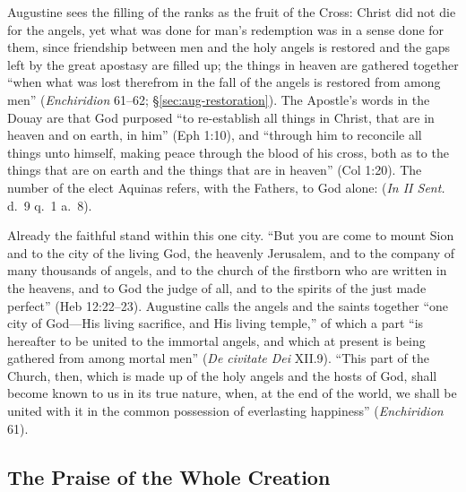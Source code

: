 Augustine sees the filling of the ranks as the fruit of the Cross: Christ
did not die for the angels, yet what was done for man's redemption was in a
sense done for them, since friendship between men and the holy angels is
restored and the gaps left by the great apostasy are filled up; the things
in heaven are gathered together ``when what was lost therefrom in the fall
of the angels is restored from among men'' (\emph{Enchiridion} 61--62;
\S\ref{sec:aug-restoration}). The Apostle's words in the Douay are that God
purposed ``to re-establish all things in Christ, that are in heaven and on
earth, in him'' (Eph 1:10), and ``through him to reconcile all things unto
himself, making peace through the blood of his cross, both as to the things
that are on earth and the things that are in heaven'' (Col 1:20). The number
of the elect Aquinas refers, with the Fathers, to God alone: 
(\emph{In II Sent.} d.~9 q.~1 a.~8).

Already the faithful stand within this one city. ``But you are come to mount
Sion and to the city of the living God, the heavenly Jerusalem, and to the
company of many thousands of angels, and to the church of the firstborn who
are written in the heavens, and to God the judge of all, and to the spirits
of the just made perfect'' (Heb 12:22--23). Augustine calls the angels and
the saints together ``one city of God---His living sacrifice, and His living
temple,'' of which a part ``is hereafter to be united to the immortal angels,
and which at present is being gathered from among mortal men'' (\emph{De
civitate Dei} XII.9). ``This part of the Church, then, which is made up of
the holy angels and the hosts of God, shall become known to us in its true
nature, when, at the end of the world, we shall be united with it in the
common possession of everlasting happiness'' (\emph{Enchiridion} 61).

\subsection{The Praise of the Whole Creation}


